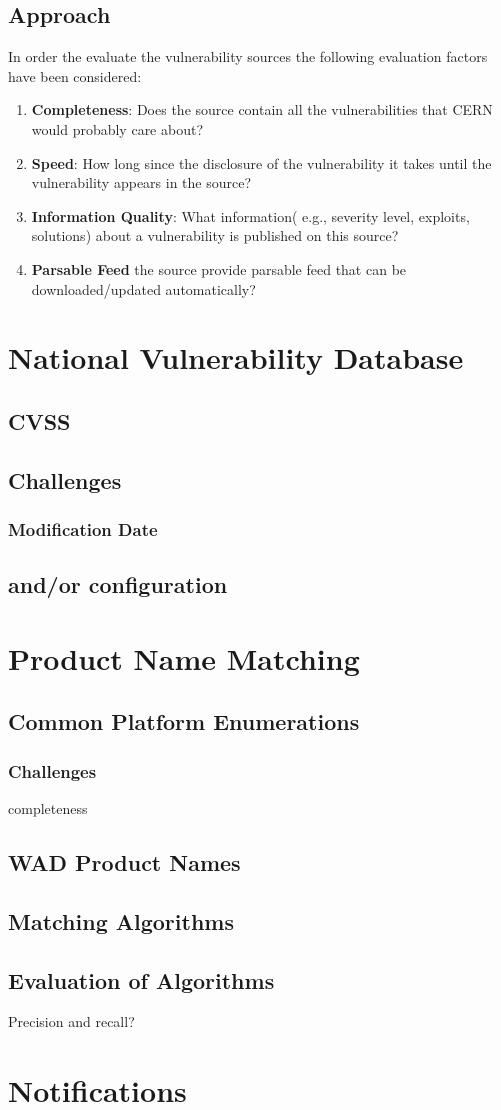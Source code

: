 \subsection{Approach}

In order the evaluate the vulnerability sources the following evaluation factors have been considered:
\begin{enumerate}
\item \textbf{Completeness}: Does the source contain all the vulnerabilities that CERN would probably care about? 
\item \textbf{Speed}: How long since the disclosure of the vulnerability it takes until the vulnerability appears in the source?
\item \textbf{Information Quality}: What information( e.g., severity level, exploits, solutions) about a vulnerability is published on this source?
\item \textbf{Parsable Feed} the source provide parsable feed that can be downloaded/updated automatically?
\end{enumerate} 



\section{National Vulnerability Database}
\subsection{CVSS}
\subsection{Challenges}
\subsubsection{Modification Date}
\subsection{and/or configuration}

\section{Product Name Matching}
\subsection{Common Platform Enumerations}
\subsubsection{Challenges}
completeness
\subsection{WAD Product Names}
\subsection{Matching Algorithms}
\subsection{Evaluation of Algorithms}
Precision and recall?
\section{Notifications}




